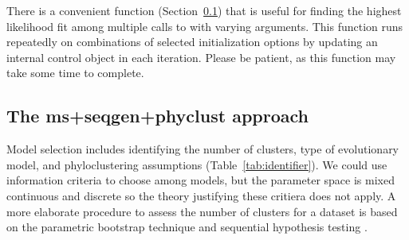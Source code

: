 There is a convenient function 
(Section~\ref{sec:msseqgenphyclust}) that is useful for finding
the highest likelihood fit among multiple calls to  with
varying arguments.
This function runs  repeatedly on
combinations of selected initialization options by updating
an internal  control object in each iteration.
Please be patient, as this function may take some time to complete.




\subsection[The ms+seqgen+phyclust approach]{The ms+seqgen+phyclust approach}
\label{sec:msseqgenphyclust}

Model selection includes identifying the number of clusters, type of evolutionary model, and phyloclustering assumptions (Table~\ref{tab:identifier}).
We could use information criteria to choose among models, but the parameter space is mixed continuous and discrete so the theory justifying these critiera does not apply.
A more elaborate procedure to assess the number of clusters
for a dataset is based on the parametric bootstrap
technique and sequential hypothesis testing \citep{Maitra2010}.

